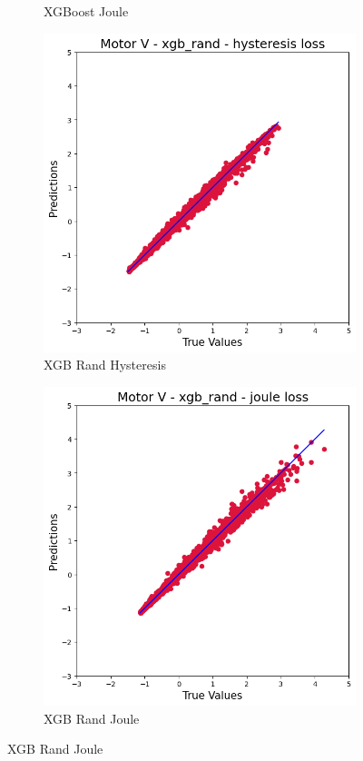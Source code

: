 \documentclass{article}
\begin{document}
\begin{figure}[!htbp]
\begin{subfigure}[b]{0.23\textwidth}
        \caption{XGBoost Joule}
    \end{subfigure}
    \hfill
    \begin{subfigure}[b]{0.23\textwidth}
        \centering
        \includegraphics[width=\textwidth]{images/V/xgb_rand_hysteresis.png}
        \caption{XGB Rand Hysteresis}
    \end{subfigure}
    \hfill
    \begin{subfigure}[b]{0.23\textwidth}
        \centering
        \includegraphics[width=\textwidth]{images/V/xgb_rand_joule.png}
        \caption{XGB Rand Joule}
    \end{subfigure}
    

\end{figure}
\end{document}
